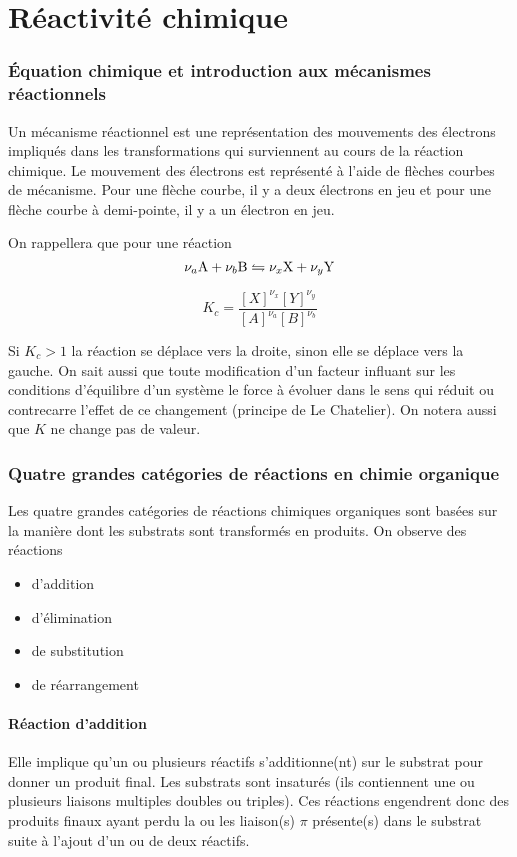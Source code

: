 \part{Réactivité chimique}

\section{\'Equation chimique et introduction aux mécanismes réactionnels}
Un mécanisme réactionnel est une représentation des mouvements des électrons impliqués dans les transformations qui surviennent au cours de la réaction chimique.
Le mouvement des électrons est représenté à l'aide de flèches courbes de mécanisme.
Pour une flèche courbe, il y a deux électrons en jeu et pour une flèche courbe à demi-pointe, il y a un électron en jeu.

On rappellera que pour une réaction
\[ \nu_{a} \ce{A} + \nu_{b} \ce{B}
\leftrightharpoons \nu_{x} \ce{X} + \nu_{y} \ce{Y} \]

\[ K_c =\frac{[X]^{\nu_x}[Y]^{\nu_y}}{[A]^{\nu_a}[B]^{\nu_b}} \]

Si $K_c > 1$ la réaction se déplace vers la droite,
sinon elle se déplace vers la gauche.
On sait aussi que toute modification d'un facteur influant 
sur les conditions d'équilibre d'un système 
le force à évoluer dans le sens qui réduit ou contrecarre l'effet de 
ce changement (principe de Le Chatelier).
On notera aussi que $K$ ne change pas de valeur.

\section{Quatre grandes catégories de réactions en chimie organique}
Les quatre grandes catégories de réactions chimiques organiques sont basées sur la manière dont les substrats sont transformés en produits.
On observe des réactions

\begin{itemize}
  \item d'addition
  \item d'élimination
  \item de substitution
  \item de réarrangement
\end{itemize}

\subsection{Réaction d'addition}
Elle implique qu'un ou plusieurs réactifs s'additionne(nt) sur le substrat pour donner un produit final.
Les substrats sont insaturés (ils contiennent une ou plusieurs liaisons multiples 
doubles ou triples).
Ces réactions engendrent donc des produits finaux ayant perdu la ou les liaison(s) $\pi$ présente(s) dans le substrat suite à l'ajout d'un ou de deux réactifs.

